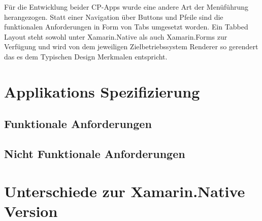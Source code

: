 	Für die Entwicklung beider CP-Apps wurde eine andere Art der Menüführung herangezogen. Statt einer Navigation über Buttons und Pfeile sind die funktionalen Anforderungen in Form von Tabs umgesetzt worden. Ein Tabbed Layout steht sowohl unter Xamarin.Native als auch Xamarin.Forms zur Verfügung und wird von dem jeweiligen Zielbetriebssystem Renderer so gerendert das es dem Typischen Design Merkmalen entspricht.

\section{Applikations Spezifizierung}
\label{sec:mckspecs}

\subsection{Funktionale Anforderungen}
\label{sec:mckbfunkcspecs}

\subsection{Nicht Funktionale Anforderungen}
\label{sec:mckbnonfuncspecs}

\section{Unterschiede zur Xamarin.Native Version}
\label{sec:mckbspecs}














